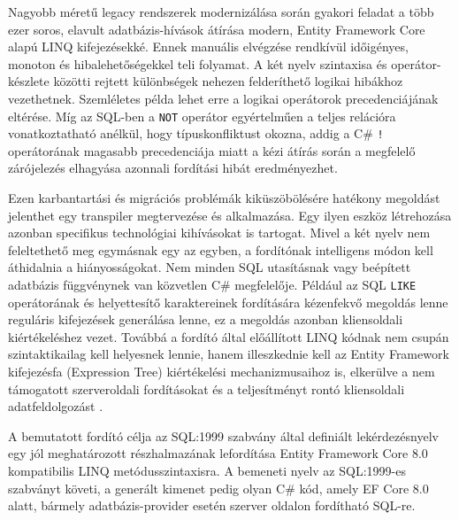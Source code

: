 


Nagyobb méretű legacy rendszerek modernizálása során gyakori feladat a több ezer soros, elavult adatbázis-hívások átírása modern, Entity Framework Core alapú LINQ kifejezésekké. Ennek manuális elvégzése rendkívül időigényes, monoton és hibalehetőségekkel teli folyamat. A két nyelv szintaxisa és operátor-készlete közötti rejtett különbségek nehezen felderíthető logikai hibákhoz vezethetnek. Szemléletes példa lehet erre a logikai operátorok precedenciájának eltérése. Míg az SQL-ben a \texttt{NOT} operátor egyértelműen a teljes relációra vonatkoztatható anélkül, hogy típuskonfliktust okozna, addig a C\# \texttt{!} operátorának magasabb precedenciája miatt a kézi átírás során a megfelelő zárójelezés elhagyása azonnali fordítási hibát eredményezhet.

Ezen karbantartási és migrációs problémák kiküszöbölésére hatékony megoldást jelenthet egy transpiler megtervezése és alkalmazása. Egy ilyen eszköz létrehozása azonban specifikus technológiai kihívásokat is tartogat. Mivel a két nyelv nem feleltethető meg egymásnak egy az egyben, a fordítónak intelligens módon kell áthidalnia a hiányosságokat. Nem minden SQL utasításnak vagy beépített adatbázis függvénynek van közvetlen C\# megfelelője. Például az SQL \texttt{LIKE} operátorának és helyettesítő karaktereinek fordítására kézenfekvő megoldás lenne reguláris kifejezések generálása lenne, ez a megoldás azonban kliensoldali kiértékeléshez vezet. Továbbá a fordító által előállított LINQ kódnak nem csupán szintaktikailag kell helyesnek lennie, hanem illeszkednie kell az Entity Framework kifejezésfa (Expression Tree) kiértékelési mechanizmusaihoz is, elkerülve a nem támogatott szerveroldali fordításokat és a teljesítményt rontó kliensoldali adatfeldolgozást \cite{nmorph2023}.

A bemutatott fordító célja az SQL:1999 szabvány által definiált lekérdezésnyelv egy jól meghatározott részhalmazának lefordítása Entity Framework Core 8.0 kompatibilis LINQ metódusszintaxisra. A bemeneti nyelv az SQL:1999-es szabványt követi, a generált kimenet pedig olyan C\# kód, amely EF Core 8.0 alatt, bármely adatbázis-provider esetén szerver oldalon fordítható SQL-re.

